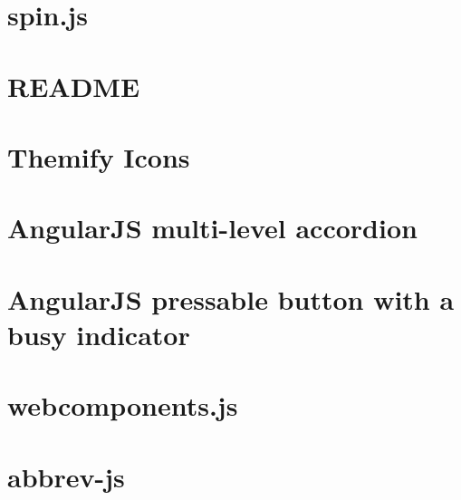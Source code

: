 \documentclass[twoside]{book}
\newcommand{\+}{\discretionary{\mbox{\scriptsize$\hookleftarrow$}}{}{}}
\begin{document}
\chapter{spin.\+js}
\label{md_app_web_bower_components_spin_8js__r_e_a_d_m_e}

\chapter{R\+E\+A\+D\+ME}
\label{md_app_web_bower_components_sweetalert__r_e_a_d_m_e}

\chapter{Themify Icons}
\label{md_app_web_bower_components_themify-icons__r_e_a_d_m_e}

\chapter{Angular\+JS multi-\/level accordion}
\label{md_app_web_bower_components_v-accordion__r_e_a_d_m_e}

\chapter{Angular\+JS pressable button with a busy indicator}
\label{md_app_web_bower_components_v-button__r_e_a_d_m_e}

\chapter{webcomponents.\+js}
\label{md_app_web_bower_components_webcomponentsjs__r_e_a_d_m_e}

\chapter{abbrev-\/js}
\label{md_app_web_node_modules_abbrev__r_e_a_d_m_e}

\end{document}
